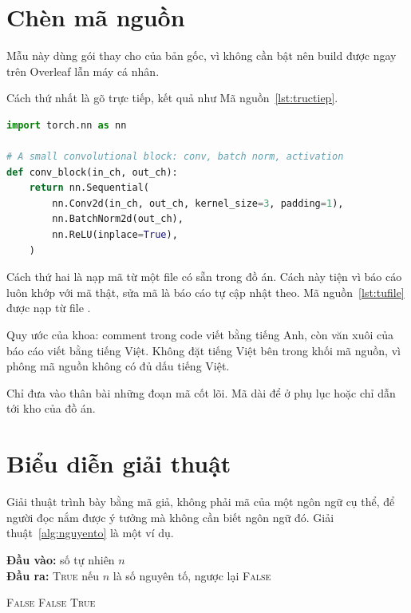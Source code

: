 \section{Chèn mã nguồn}

Mẫu này dùng gói  thay cho  của bản gốc, vì
 không cần bật  nên build được ngay trên
Overleaf lẫn máy cá nhân.

Cách thứ nhất là gõ trực tiếp, kết quả như Mã nguồn~\ref{lst:tructiep}.

\begin{lstlisting}[language=Python, caption={Chèn mã nguồn trực tiếp vào báo cáo.}, label={lst:tructiep}]
import torch.nn as nn

# A small convolutional block: conv, batch norm, activation
def conv_block(in_ch, out_ch):
    return nn.Sequential(
        nn.Conv2d(in_ch, out_ch, kernel_size=3, padding=1),
        nn.BatchNorm2d(out_ch),
        nn.ReLU(inplace=True),
    )
\end{lstlisting}

Cách thứ hai là nạp mã từ một file có sẵn trong đồ án. Cách này tiện vì báo
cáo luôn khớp với mã thật, sửa mã là báo cáo tự cập nhật theo. Mã
nguồn~\ref{lst:tufile} được nạp từ file .



\begin{luuy}
Quy ước của khoa: comment trong code viết bằng tiếng Anh, còn văn xuôi của
báo cáo viết bằng tiếng Việt. Không đặt tiếng Việt bên trong khối mã nguồn,
vì phông mã nguồn không có đủ dấu tiếng Việt.
\end{luuy}

Chỉ đưa vào thân bài những đoạn mã cốt lõi. Mã dài để ở phụ lục hoặc chỉ dẫn
tới kho  của đồ án.

\section{Biểu diễn giải thuật}

Giải thuật trình bày bằng mã giả, không phải mã của một ngôn ngữ cụ thể,
để người đọc nắm được ý tưởng mà không cần biết ngôn ngữ đó.
Giải thuật~\ref{alg:nguyento} là một ví dụ.

\begin{algorithm}[H]
\caption{Kiểm tra một số tự nhiên có phải số nguyên tố hay không}
\label{alg:nguyento}
\hspace*{\algorithmicindent}\textbf{Đầu vào:} số tự nhiên $n$\\
\hspace*{\algorithmicindent}\textbf{Đầu ra:} \textsc{True} nếu $n$ là số nguyên tố, ngược lại \textsc{False}
\begin{algorithmic}[1]
    \State \Return \textsc{False}
  \EndIf
      \State \Return \textsc{False}
    \EndIf
  \EndFor
  \State \Return \textsc{True}
\EndFunction
\end{algorithmic}
\end{algorithm}

